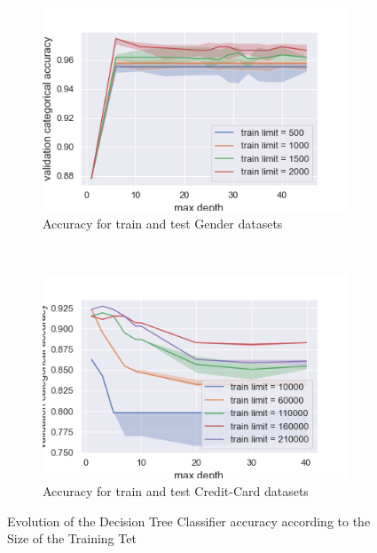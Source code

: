 \documentclass[10pt]{article}
\begin{document}
		\begin{figure}[]
			\centering
			\begin{subfigure}[]{0.45\columnwidth}
				\centering
				\includegraphics[width=\linewidth]{../graphics/tree_gender_max_depth_score_type_train_limit.png}
				\caption{Accuracy for train and test Gender datasets}
				\label{tree:gender_train_size_score_type_score_type}
			\end{subfigure}
			~
			\begin{subfigure}[]{0.45\columnwidth}
				\centering
				\includegraphics[width=\linewidth]{../graphics/tree_creditcard_max_depth_score_type_train_limit.png}
				\caption{Accuracy for train and test Credit-Card datasets}
				\label{tree:creditcard_train_size_score_type_score_type}
			\end{subfigure}
			\caption{Evolution of the Decision Tree Classifier accuracy according to the Size of the Training Tet}
			\label{tree:train_size_score_type_score_type}
		\end{figure}
\end{document}
